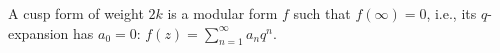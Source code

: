 A cusp form of weight $2k$ is a modular form $f$ such that $f(\infty) = 0$, i.e., its $q$-expansion has $a_0 = 0$: $f(z) = \sum_{n=1}^{\infty} a_n q^n$.
